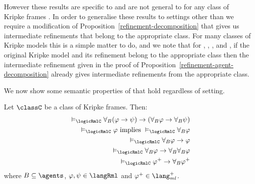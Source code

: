 However these results are specific to \logicRmlK{} and are not general to \logicRmlC{} for any class of Kripke frames \classC{}.
In order to generalise these results to settings other than \classK{} we require a modification of Proposition~\ref{refinement-decomposition} that gives us intermediate refinements that belong to the appropriate class.
For many classes of Kripke models this is a simple matter to do, and we note that for \classKF{}, \classKFF{}, \classKD{}, and \classS{}, if the original Kripke model and its refinement belong to the appropriate class then the intermediate refinement given in the proof of Proposition~\ref{refinement-agent-decomposition} already gives intermediate refinements from the appropriate class.

We now show some semantic properties of \logicRml{} that hold regardless of setting.

\begin{proposition}\label{rml-validities}
Let $\classC$ be a class of Kripke frames. Then:
\begin{eqnarray}
    &&\entails_\logicRmlC \allrefsBs (\phi \implies \psi) \implies (\allrefsBs \phi \implies \allrefsBs \psi) \label{rml-validity-r}\\
    &&\entails_\logicRmlC \phi \text{ implies } \entails_\logicRmlC \allrefsBs \phi \label{rml-validity-necr}\\
    &&\entails_\logicRmlC \allrefsBs \phi \implies \phi \label{rml-validity-rt}\\
    &&\entails_\logicRmlC \allrefsBs \phi \implies \allrefsBs \allrefsBs \phi \label{rml-validity-r4}\\
    &&\entails_\logicRmlC \phi^+ \implies \allrefsBs \phi^+ \label{rml-validity-rp}
\end{eqnarray}
where $\agentsB \subseteq \agents$, $\phi, \psi \in \langRml$ and $\phi^+ \in \langMlPlus$.
\end{proposition}

